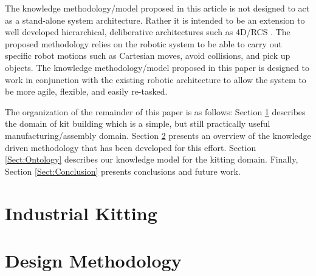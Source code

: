 \documentclass[preprint,12pt]{elsarticle}
\begin{document}
The knowledge methodology/model proposed in this article is not designed to act as a stand-alone
system architecture. Rather it is intended to be an extension to well developed hierarchical, 
deliberative architectures such as 4D/RCS \cite{Albus2000}. The proposed methodology relies on the robotic system
to be able to carry out
specific robot motions such as Cartesian moves, avoid collisions, and pick up objects. 
The knowledge methodology/model proposed in this paper is designed to work in conjunction with the existing
robotic architecture to allow the system to be more agile, flexible, and easily re-tasked.


The organization of the remainder of this paper is as follows: Section \ref{Sect:Kitting} describes the domain of kit building
which is a simple, but still practically useful manufacturing/assembly domain.
Section \ref{Sect:Methodology} presents an overview of the knowledge driven methodology that
has been developed for this effort.  Section \ref{Sect:Ontology} describes our knowledge model for the kitting
domain. Finally, Section \ref{Sect:Conclusion} presents conclusions and
future work.

\section{Industrial Kitting}
\label{Sect:Kitting}


\section{Design Methodology}
\label{Sect:Methodology}

\end{document}
